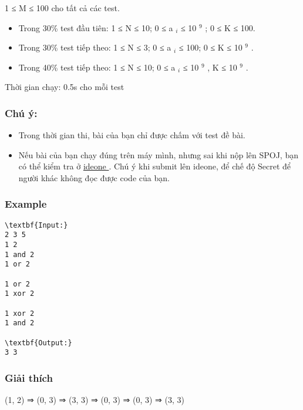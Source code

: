    1 ≤ M ≤ 100 cho tất cả các test.  
\begin{itemize}
	\item      Trong 30\% test đầu tiên: 1 ≤ N ≤ 10; 0 ≤ a    $_     i    $     ≤ 10    $^     9    $     ; 0 ≤ K ≤ 100.    
	\item      Trong 30\% test tiếp theo: 1 ≤ N ≤ 3; 0 ≤ a     $_      i     $     ≤ 100; 0 ≤ K ≤ 10     $^      9     $     .    
	\item      Trong 40\% test tiếp theo: 1 ≤ N ≤ 10; 0 ≤ a     $_      i     $      ≤ 10     $^      9     $     , K ≤ 10     $^      9     $     .    
\end{itemize}

   Thời gian chạy: 0.5s cho mỗi test  

\subsubsection{   Chú ý:  }
\begin{itemize}
	\item     Trong thời gian thi, bài của bạn chỉ được chấm với test đề bài.   
	\item     Nếu bài của bạn chạy đúng trên máy mình, nhưng sai khi nộp lên SPOJ, bạn có thể kiểm tra ở    \href{https://ideone.com}{     ideone    }    . Chú ý khi submit lên ideone, để chế độ Secret để người khác không đọc được code của bạn.   
\end{itemize}

\subsubsection{   Example  }
\begin{verbatim}
\textbf{Input:}
2 3 5
1 2
1 and 2
1 or 2

1 or 2
1 xor 2

1 xor 2
1 and 2 

\textbf{Output:}
3 3
\end{verbatim}

\subsubsection{     Giải thích    }

     (1, 2) ⇒ (0, 3) ⇒ (3, 3) ⇒ (0, 3) ⇒ (0, 3) ⇒ (3, 3)    